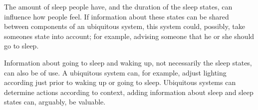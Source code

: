 The amount of sleep people have, and the duration of the sleep states, can influence how people feel. If information about these states can be shared between components of an ubiquitous system, this system could, possibly, take someones state into account; for example, advising someone that he or she should go to sleep.

Information about going to sleep and waking up, not necessarily the sleep states, can also be of use. A ubiquitous system can, for example, adjust lighting according just prior to waking up or going to sleep. Ubiquitous systems can determine actions according to context, adding information about sleep and sleep states can, arguably, be valuable.


